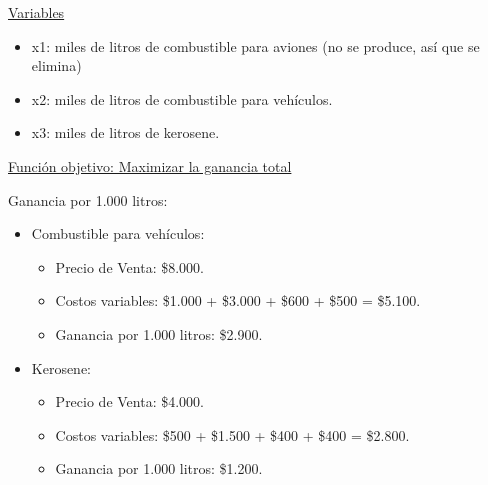\documentclass[10pt,a4paper]{article}
\begin{document}
\begin{enumerate}
\begin{itemize}
    \end{itemize}

    \underline{Variables}

    \begin{itemize}

        \item x1: miles de litros de combustible para aviones (no se produce, así que se elimina)
        \item x2: miles de litros de combustible para vehículos.
        \item x3: miles de litros de kerosene. \\

    \end{itemize}

    \clearpage

    \underline{Función objetivo: Maximizar la ganancia total}

    \vspace{0.5em}

    Ganancia por 1.000 litros:

    \begin{itemize}

        \item Combustible para vehículos:
        \begin{itemize}

            \item Precio de Venta: \$8.000.
            \item Costos variables: \$1.000 + \$3.000 + \$600 + \$500 = \$5.100.
            \item Ganancia por 1.000 litros: \$2.900. \\
    
        \end{itemize}

        \item Kerosene:
        \begin{itemize}

            \item Precio de Venta: \$4.000.
            \item Costos variables: \$500 + \$1.500 + \$400 + \$400 = \$2.800.
            \item Ganancia por 1.000 litros: \$1.200. \\
    
        \end{itemize}

    \end{itemize}



\end{enumerate}
\end{document}
